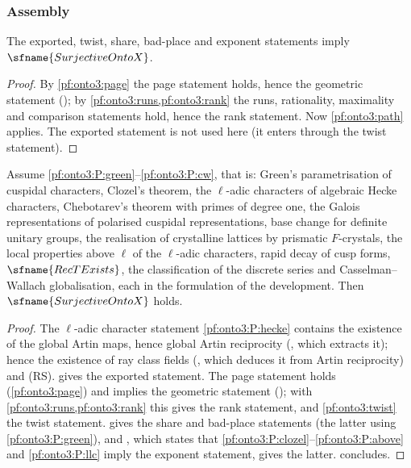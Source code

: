 \subsubsection{Assembly}

\begin{theorem}\label{pf:onto3:fivest}
The exported, twist, share, bad-place and exponent statements imply $\sfname{SurjectiveOntoX}$.
\end{theorem}

\begin{proof}
By \cref{pf:onto3:page} the page statement holds, hence the geometric statement
(); by \cref{pf:onto3:runs,pf:onto3:rank} the runs, rationality,
maximality and comparison statements hold, hence the rank statement. Now \cref{pf:onto3:path} applies. The exported
statement is not used here (it enters through the twist statement).
\end{proof}

\begin{theorem}\label{pf:onto3:ontoX}
Assume \ref{pf:onto3:P:green}--\ref{pf:onto3:P:cw}, that is: Green's parametrisation of cuspidal characters,
Clozel's theorem, the $\ell$-adic characters of algebraic Hecke characters, Chebotarev's theorem with primes of
degree one, the Galois representations of polarised cuspidal representations, base change for definite unitary
groups, the realisation of crystalline lattices by prismatic $F$-crystals, the local properties above $\ell$ of the
$\ell$-adic characters, rapid decay of cusp forms, $\sfname{RecTExists}$, the classification of the discrete series
and Casselman--Wallach globalisation, each in the formulation of the development. Then $\sfname{SurjectiveOntoX}$
holds.
\end{theorem}

\begin{proof}
The $\ell$-adic character statement \ref{pf:onto3:P:hecke} contains the existence of the global Artin maps, hence
global Artin reciprocity (, which extracts it);
hence the existence of ray class fields (,
which deduces it from Artin reciprocity) and (RS).  gives the exported statement. The page
statement holds (\cref{pf:onto3:page}) and implies the geometric statement
(); with \cref{pf:onto3:runs,pf:onto3:rank} this gives the rank
statement, and \cref{pf:onto3:twist} the twist statement.  gives the share and bad-place
statements (the latter using \ref{pf:onto3:P:green}), and
, which states that
\ref{pf:onto3:P:clozel}--\ref{pf:onto3:P:above} and \ref{pf:onto3:P:llc} imply the exponent statement, gives the
latter.  concludes.
\end{proof}

